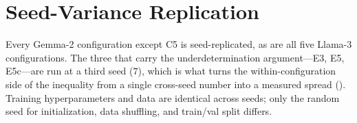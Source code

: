 \documentclass[11pt]{article}
\begin{document}
\begin{table}[!htbp]
\label{tab:bf16}
\end{table}

\FloatBarrier
\section{Seed-Variance Replication}
\label{app:seed_variance}

Every Gemma-2 configuration except C5 is seed-replicated, as are all five Llama-3 configurations. The three that carry the underdetermination argument---E3, E5, E5c---are run at a third seed ($7$), which is what turns the within-configuration side of the inequality from a single cross-seed number into a measured spread (). Training hyperparameters and data are identical across seeds; only the random seed for initialization, data shuffling, and train/val split differs.
\end{document}
